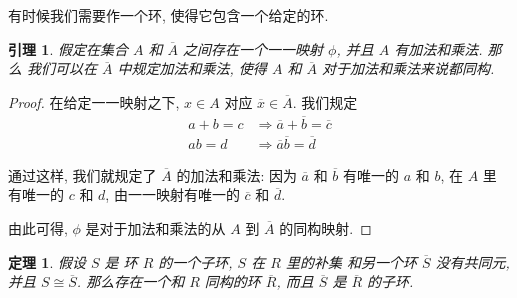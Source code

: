 \documentclass[utf8]{ctexbook}
\newtheorem{theorem}{定理}[section]
\newtheorem{lemma}{引理}[section]
\begin{document}
有时候我们需要作一个环, 使得它包含一个给定的环.

\begin{lemma}
假定在集合 $A$ 和 $\overline{A}$ 之间存在一个一一映射 $\phi$, 并且 $A$ 有加法和乘法. 那么 我们可以在 $\overline{A}$ 中规定加法和乘法, 使得 $A$ 和 $\overline{A}$ 对于加法和乘法来说都同构.
\end{lemma}

\begin{proof}
在给定一一映射之下, $x \in A$ 对应 $\overline{x} \in \overline{A}$. 我们规定
\begin{align*}
a + b = c & \Longrightarrow \overline{a} + \overline{b} = \overline{c} \\
ab = d & \Longrightarrow \overline{a} \overline{b} = \overline{d} 
\end{align*}

通过这样, 我们就规定了 $\overline{A}$ 的加法和乘法: 因为 $\overline{a}$ 和 $\overline{b}$ 有唯一的 $a$ 和 $b$, 在 $A$ 里 有唯一的 $c$ 和 $d$, 由一一映射有唯一的 $\overline{c}$ 和 $\overline{d}$. 

由此可得, $\phi$ 是对于加法和乘法的从 $A$ 到 $\overline{A}$ 的同构映射.

\end{proof}

\begin{theorem}\label{theorem_ring_iso_construction}
假设 $S$ 是 环 $R$ 的一个子环, $S$ 在 $R$ 里的补集 和另一个环 $\overline{S}$ 没有共同元, 并且 $S \cong \overline{S}$. 那么存在一个和 $R$ 同构的环 $\overline{R}$, 而且 $\overline{S}$ 是 $\overline{R}$ 的子环.
\end{theorem}
\end{document}
